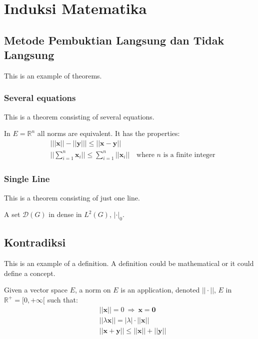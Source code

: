 \documentclass[11pt,fleqn]{book} %
\begin{document}
\chapter{Induksi Matematika}

\section{Metode Pembuktian Langsung dan Tidak Langsung}

This is an example of theorems.

\subsection{Several equations}
This is a theorem consisting of several equations.

\begin{theorem}
In $E=\mathbb{R}^n$ all norms are equivalent. It has the properties:
\begin{align}
& \big| ||\mathbf{x}|| - ||\mathbf{y}|| \big|\leq || \mathbf{x}- \mathbf{y}||\\
&  ||\sum_{i=1}^n\mathbf{x}_i||\leq \sum_{i=1}^n||\mathbf{x}_i||\quad\text{where $n$ is a finite integer}
\end{align}
\end{theorem}

\subsection{Single Line}
This is a theorem consisting of just one line.

\begin{theorem}
A set $\mathcal{D}(G)$ in dense in $L^2(G)$, $|\cdot|_0$. 
\end{theorem}


\section{Kontradiksi}

This is an example of a definition. A definition could be mathematical or it could define a concept.

\begin{definition}
Given a vector space $E$, a norm on $E$ is an application, denoted $||\cdot||$, $E$ in $\mathbb{R}^+=[0,+\infty[$ such that:
\begin{align}
& ||\mathbf{x}||=0\ \Rightarrow\ \mathbf{x}=\mathbf{0}\\
& ||\lambda \mathbf{x}||=|\lambda|\cdot ||\mathbf{x}||\\
& ||\mathbf{x}+\mathbf{y}||\leq ||\mathbf{x}||+||\mathbf{y}||
\end{align}
\end{definition}
\end{document}
